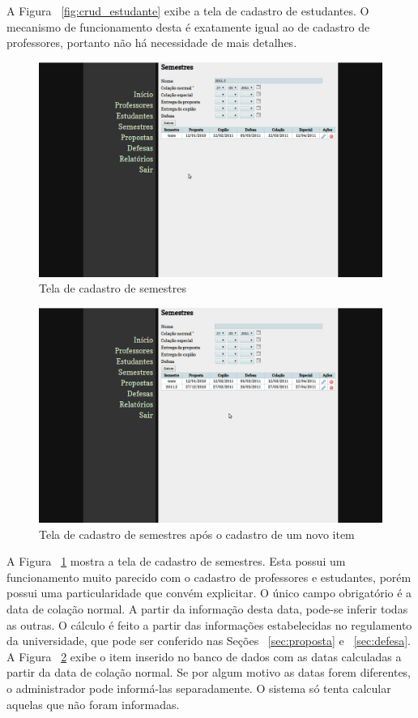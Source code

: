 A Figura ~\ref{fig:crud_estudante} exibe a tela de cadastro de estudantes. O mecanismo de funcionamento
desta é exatamente igual ao de cadastro de professores, portanto não há necessidade de mais detalhes.

\begin{figure}[htbp]
\centering
\includegraphics[width=1\textwidth]{fig/telas/administrador/crud_semestre.png}
\caption{Tela de cadastro de semestres}
\label{fig:crud_semestre}
\end{figure}

\begin{figure}[htbp]
\centering
\includegraphics[width=1\textwidth]{fig/telas/administrador/crud_semestre_calculo_datas.png}
\caption{Tela de cadastro de semestres após o cadastro de um novo item}
\label{fig:crud_semestre_calculo_datas}
\end{figure}

A Figura ~\ref{fig:crud_semestre} mostra a tela de cadastro de semestres. Esta possui um funcionamento
muito parecido com o cadastro de professores e estudantes, porém possui uma particularidade que 
convém explicitar. O único campo obrigatório é a data de colação normal. A partir da informação desta
data, pode-se inferir todas as outras. O cálculo é feito a partir das informações estabelecidas
no regulamento da universidade, que pode ser conferido nas Seções ~\ref{sec:proposta} e ~\ref{sec:defesa}.
A Figura ~\ref{fig:crud_semestre_calculo_datas} exibe o item inserido no banco de dados com as
datas calculadas a partir da data de colação normal. Se por algum motivo as datas forem diferentes,
o administrador pode informá-las separadamente. O sistema só tenta calcular aquelas que não foram
informadas.

